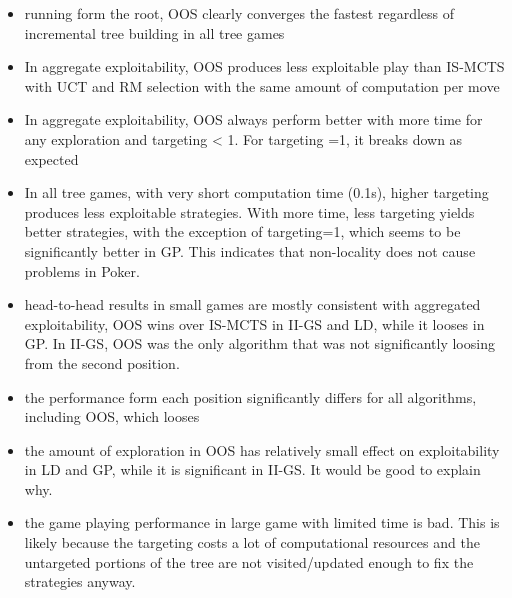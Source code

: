 \documentclass{aamas2015}
\begin{document}
\begin{itemize}
\item running form the root, OOS clearly converges the fastest regardless of incremental tree building in all tree games
\item In aggregate exploitability, OOS produces less exploitable play than IS-MCTS with UCT and RM selection with the same amount of computation per move
\item In aggregate exploitability, OOS always perform better with more  time for any exploration and targeting < 1. For targeting =1, it breaks down as expected
\item In all tree games, with very short computation time (0.1s), higher targeting produces less exploitable strategies. With more time, less targeting yields better strategies, with the exception of targeting=1, which seems to be significantly better in GP. This indicates that non-locality does not cause problems in Poker.
\item head-to-head results in small games are mostly consistent with aggregated exploitability, OOS wins over IS-MCTS in II-GS and LD, while it looses in GP. In II-GS, OOS was the only algorithm that was not significantly loosing from the second position.
\item the performance form each position significantly differs for all algorithms, including OOS, which looses 
\item the amount of exploration in OOS has relatively small effect on exploitability in LD and GP, while it is significant in II-GS. It would be good to explain why.
\item the game playing performance in large game with limited time is bad. This is likely because the targeting costs a lot of computational resources and the untargeted portions of the tree are not visited/updated enough to fix the strategies anyway.
\end{itemize}
\end{document}
